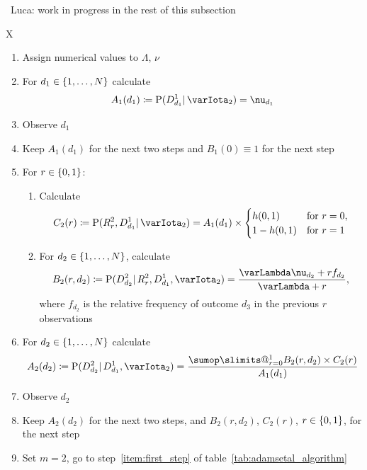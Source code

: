 \documentclass[\ifafour a4paper,12pt,\else a5paper,10pt,\fi%
onecolumn,oneside,article,%
british%
]{memoir}
\makeatletter
\theoremstyle{remark}
\theoremstyle{innote}
\def\sum{\DOTSI\sumop\slimits@}
\newcommand*{\defd}{\coloneqq}
\DeclarePairedDelimiter\set{\{}{\}}
\newcommand*{\p}{\mathrm{P}}%
\renewcommand*{\|}{\mathpunct{|}}
\newcommand*{\puzzle}{\maltese}
\newcommand{\mynote}[1]{ {\color{notecolour}\puzzle\ #1\ }}
\newcommand*{\yff}{f}
\newcommand*{\yI}{\varIota}
\newcommand*{\yMc}{\yI_2}
\newcommand*{\yN}{\varLambda}
\newcommand*{\ynn}{\nu}
\newcommand*{\yrs}{h}
\makeatother
\begin{document}
\bigskip\mynote{Luca: work in progress in the rest of this subsection}

\begin{table}[!b]
  \centering
  \caption{Initial steps of predictive algorithm}
  \label{tab:adamsetal_initial}
  \begin{tabularx}{\textwidth}{X}\hline
    \begin{enumerate}%
    \item Assign numerical values to $\yN$, $\ynn$
    \item For $d_1 \in \set{1,\dotsc,N}$ calculate
      \[A_1(d_1)\defd \p(D^{1}_{d_{1}} \|  \yMc) =\ynn_{d_1} \]
    \item Observe $d_1$
    \item Keep  $A_1(d_1)$ for the next two steps and $B_1(0)\equiv 1$ for
      the next step

      \bigskip
    \item For $r \in\set{0,1}$:
      \begin{enumerate}[label*=\arabic*.]
   \item Calculate
      \[
        C_2(r) \defd \p(R^{2}_{r}, D^{1}_{d_1} \| \yMc)
        =
A_1(d_1) \times \begin{cases}
          \yrs(0,1) &\text{for $r=0$},\\ 1-\yrs(0,1)&\text{for $r=1$}
        \end{cases}
      \]
      \item For $d_{2} \in \set{1,\dotsc,N}$, calculate
        \[ 
          B_{2}(r,d_{2}) \defd
          \p(D^{2}_{d_{2}} \| R^{2}_{r}, D^{1}_{d_{1}}, \yMc) =
         \frac{\yN\ynn_{d_{2}}+r\yff_{d_{2}}}{\yN + r},
        \]
     where $\yff_{d_{2}}$ is the relative frequency of outcome $d_{3}$ in
     the previous $r$ observations
    \end{enumerate}
  \item  For $d_2 \in \set{1,\dotsc,N}$ calculate
      \[A_2(d_2) \defd
        \p(D^{2}_{d_{2}} \| D^{1}_{d_{1}}, \yMc) =
\frac{\sum_{r=0}^{1} B_{2}(r,d_{2}) \times C_{2}(r)}{A_{1}(d_{1})} \]
\item Observe $d_2$
\item Keep $A_{2}(d_{2})$ for the next two steps, and
  $B_{2}(r,d_{2})$, $C_{2}(r)$, $r\in\set{0,1}$, for the next step
\item Set $m=2$, go to step~\ref{item:first_step} of table~\ref{tab:adamsetal_algorithm}
\end{enumerate}
\\\hline
  \end{tabularx}
\end{table}
\end{document}
